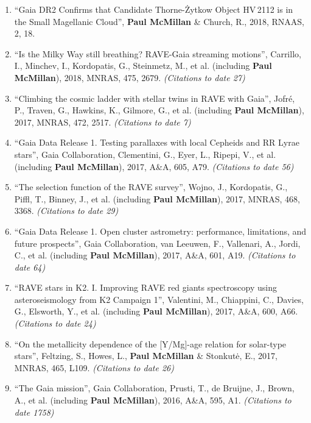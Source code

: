 \documentclass{resume}
\begin{document}
\begin{enumerate}
\item ``Gaia DR2 Confirms that Candidate Thorne-\.Zytkow Object HV\,2112 is in the Small Magellanic Cloud'', \textbf{Paul McMillan} \& Church, R., 2018, RNAAS, 2, 18.

\item ``Is the Milky Way still breathing? RAVE-Gaia streaming motions'', Carrillo, I., Minchev, I., Kordopatis, G., Steinmetz, M., et al. (including \textbf{Paul McMillan}), 2018, MNRAS, 475, 2679. \textit{(Citations to date 27)}

\item ``Climbing the cosmic ladder with stellar twins in RAVE with Gaia'', Jofr\'e, P., Traven, G., Hawkins, K., Gilmore, G., et al. (including \textbf{Paul McMillan}), 2017, MNRAS, 472, 2517. \textit{(Citations to date 7)}

\item ``Gaia Data Release 1. Testing parallaxes with local Cepheids and RR Lyrae stars'', Gaia Collaboration, Clementini, G., Eyer, L., Ripepi, V., et al. (including \textbf{Paul McMillan}), 2017, A\&A, 605, A79. \textit{(Citations to date 56)}

\item ``The selection function of the RAVE survey'', Wojno, J., Kordopatis, G., Piffl, T., Binney, J., et al. (including \textbf{Paul McMillan}), 2017, MNRAS, 468, 3368. \textit{(Citations to date 29)}

\item ``Gaia Data Release 1. Open cluster astrometry: performance, limitations, and future prospects'', Gaia Collaboration, van Leeuwen, F., Vallenari, A., Jordi, C., et al. (including \textbf{Paul McMillan}), 2017, A\&A, 601, A19. \textit{(Citations to date 64)}

\item ``RAVE stars in K2. I. Improving RAVE red giants spectroscopy using asteroseismology from K2 Campaign 1'', Valentini, M., Chiappini, C., Davies, G., Elsworth, Y., et al. (including \textbf{Paul McMillan}), 2017, A\&A, 600, A66. \textit{(Citations to date 24)}

\item ``On the metallicity dependence of the [Y/Mg]-age relation for solar-type stars'', Feltzing, S., Howes, L., \textbf{Paul McMillan} \& Stonkut\.{e}, E., 2017, MNRAS, 465, L109. \textit{(Citations to date 26)}

\item ``The Gaia mission'', Gaia Collaboration, Prusti, T., de Bruijne, J., Brown, A., et al. (including \textbf{Paul McMillan}), 2016, A\&A, 595, A1. \textit{(Citations to date 1758)}


\end{enumerate}
\end{document}
